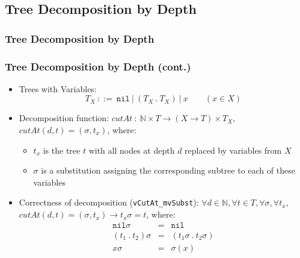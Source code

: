 \documentclass{beamer}
\begin{document}
\subsection{Tree Decomposition by Depth}

\begin{frame}[fragile]
  \frametitle{Tree Decomposition by Depth}
\end{frame}

\begin{frame}
  \frametitle{Tree Decomposition by Depth (cont.)}
  \begin{itemize}
    \item Trees with Variables:
	  \[
		T_X ~::=~ \texttt{nil} ~|~ (T_X ~.~ T_X) ~|~ x \qquad (x \in X)
	  \]
    \item Decomposition function: 
      $\mathit{cutAt} ~:~ \mathbb{N} \times T \rightarrow (X \rightarrow T) \times T_X$,
      $cutAt(d, t) = (\sigma, t_x)$, where:
      \begin{itemize}
	    \item $t_x$ is the tree $t$ with all nodes at depth $d$ replaced by variables from $X$
	    \item $\sigma$ is a substitution assigning the corresponding subtree to each of these variables
	  \end{itemize}
	\item Correctness of decomposition (\texttt{vCutAt\_mvSubst}): 
	  $\forall d \in \mathbb{N}, \forall t \in T, \forall \sigma, \forall t_x,$
	  $cutAt(d, t) = (\sigma, t_x) \rightarrow t_x \sigma = t$, where:
	  \[\begin{array}{lcl}
	    \texttt{nil} \sigma & = & \texttt{nil} \\
	    (t_1 ~.~ t_2) \sigma & = & (t_1 \sigma ~.~ t_2 \sigma) \\
	    x \sigma & = & \sigma(x)
	  \end{array}
	  \]
  \end{itemize}
\end{frame}
\end{document}
